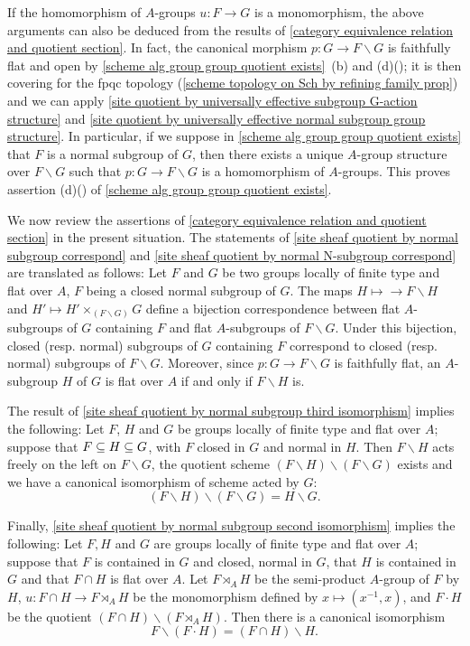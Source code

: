 If the homomorphism of $A$-groups $u:F\to G$ is a monomorphism, the above arguments can also be deduced from the results of \autoref{category equivalence relation and quotient section}. In fact, the canonical morphism $p:G\to F\backslash G$ is faithfully flat and open by \cref{scheme alg group group quotient exists}~(b) and (d)(); it is then covering for the fpqc topology (\cref{scheme topology on Sch by refining family prop}) and we can apply \cref{site quotient by universally effective subgroup G-action structure} and \cref{site quotient by universally effective normal subgroup group structure}. In particular, if we suppose in \cref{scheme alg group group quotient exists} that $F$ is a normal subgroup of $G$, then there exists a unique $A$-group structure over $F\backslash G$ such that $p:G\to F\backslash G$ is a homomorphism of $A$-groups. This proves assertion (d)() of \cref{scheme alg group group quotient exists}.

We now review the assertions of \autoref{category equivalence relation and quotient section} in the present situation. The statements of \cref{site sheaf quotient by normal subgroup correspond} and \cref{site sheaf quotient by normal N-subgroup correspond} are translated as follows: Let $F$ and $G$ be two groups locally of finite type and flat over $A$, $F$ being a closed normal subgroup of $G$. The maps $H\mapsto\to F\backslash H$ and $H'\mapsto H'\times_{(F\backslash G)}G$ define a bijection correspondence between flat $A$-subgroups of $G$ containing $F$ and flat $A$-subgroups of $F\backslash G$. Under this bijection, closed (resp. normal) subgroups of $G$ containing $F$ correspond to closed (resp. normal) subgroups of $F\backslash G$. Moreover, since $p:G\to F\backslash G$ is faithfully flat, an $A$-subgroup $H$ of $G$ is flat over $A$ if and only if $F\backslash H$ is.\par

The result of \cref{site sheaf quotient by normal subgroup third isomorphism} implies the following: Let $F$, $H$ and $G$ be groups locally of finite type and flat over $A$; suppose that $F\subseteq H\subseteq G$, with $F$ closed in $G$ and normal in $H$. Then $F\backslash H$ acts freely on the left on $F\backslash G$, the quotient scheme $(F\backslash H)\backslash(F\backslash G)$ exists and we have a canonical isomorphism of scheme acted by $G$:
\[(F\backslash H)\backslash(F\backslash G)=H\backslash G.\]

Finally, \cref{site sheaf quotient by normal subgroup second isomorphism} implies the following: Let $F,H$ and $G$ are groups locally of finite type and flat over $A$; suppose that $F$ is contained in $G$ and closed, normal in $G$, that $H$ is contained in $G$ and that $F\cap H$ is flat over $A$. Let $F\rtimes_AH$ be the semi-product $A$-group of $F$ by $H$, $u:F\cap H\to F\rtimes_AH$ be the monomorphism defined by $x\mapsto (x^{-1},x)$, and $F\cdot H$ be the quotient $(F\cap H)\backslash(F\rtimes_AH)$. Then there is a canonical isomorphism
\[F\backslash(F\cdot H)=(F\cap H)\backslash H.\]

